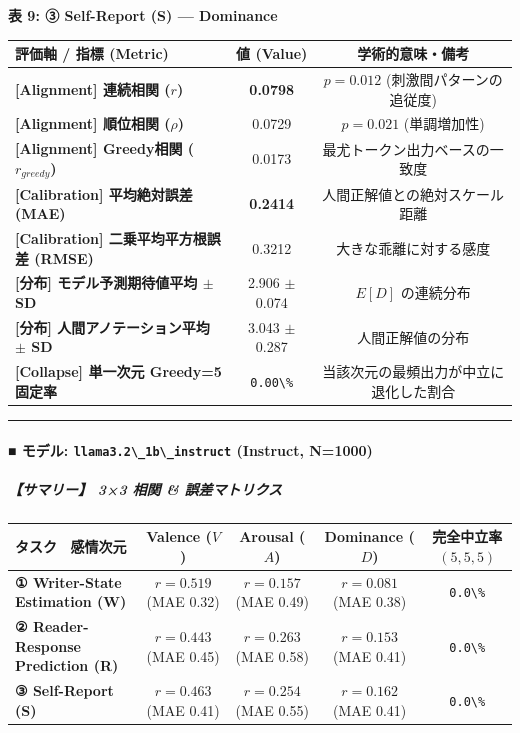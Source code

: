 \textbf{表 9: ③ Self-Report (S) — Dominance}
\begin{center}
\small
\begin{tabular}{lcc}
\toprule
\textbf{評価軸 / 指標 (Metric)} & \textbf{値 (Value)} & \textbf{学術的意味・備考} \\
\midrule
\textbf{[Alignment] 連続相関 ($r$)} & \textbf{0.0798} & $p = 0.012 $ (刺激間パターンの追従度) \\
\textbf{[Alignment] 順位相関 ($\rho$)} & 0.0729 & $p = 0.021 $ (単調増加性) \\
\textbf{[Alignment] Greedy相関 ($r_{greedy}$)} & 0.0173 & 最尤トークン出力ベースの一致度 \\
\textbf{[Calibration] 平均絶対誤差 (MAE)} & \textbf{0.2414} & 人間正解値との絶対スケール距離 \\
\textbf{[Calibration] 二乗平均平方根誤差 (RMSE)} & 0.3212 & 大きな乖離に対する感度 \\
\textbf{[分布] モデル予測期待値平均 $\pm$ SD} & 2.906 $\pm$ 0.074 & $E[D]$ の連続分布 \\
\textbf{[分布] 人間アノテーション平均 $\pm$ SD} & 3.043 $\pm$ 0.287 & 人間正解値の分布 \\
\textbf{[Collapse] 単一次元 Greedy=5 固定率} & \texttt{0.00\textbackslash{}\%} & 当該次元の最頻出力が中立に退化した割合 \\
\bottomrule
\end{tabular}
\end{center}


\vspace{0.5em}\hrule\vspace{0.5em}

\paragraph{■ モデル: \texttt{llama3.2\textbackslash{}\_1b\textbackslash{}\_instruct} (Instruct, N=1000)}

\subparagraph{【サマリー】 3×3 相関 \& 誤差マトリクス}
\begin{center}
\small
\begin{tabular}{lcccc}
\toprule
\textbf{タスク \ 感情次元} & \textbf{Valence ($V$)} & \textbf{Arousal ($A$)} & \textbf{Dominance ($D$)} & \textbf{完全中立率 $(5,5,5)$} \\
\midrule
\textbf{① Writer-State Estimation (W)} & \textbf{$r=0.519$} (MAE 0.32) & \textbf{$r=0.157$} (MAE 0.49) & \textbf{$r=0.081$} (MAE 0.38) & \texttt{0.0\textbackslash{}\%} \\
\textbf{② Reader-Response Prediction (R)} & \textbf{$r=0.443$} (MAE 0.45) & \textbf{$r=0.263$} (MAE 0.58) & \textbf{$r=0.153$} (MAE 0.41) & \texttt{0.0\textbackslash{}\%} \\
\textbf{③ Self-Report (S)} & \textbf{$r=0.463$} (MAE 0.41) & \textbf{$r=0.254$} (MAE 0.55) & \textbf{$r=0.162$} (MAE 0.41) & \texttt{0.0\textbackslash{}\%} \\
\bottomrule
\end{tabular}
\end{center}


